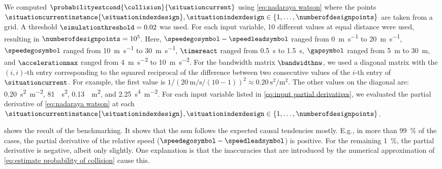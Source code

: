 We computed $\probabilityestcond{\collision}{\situationcurrent}$ using \cref{eq:nadaraya watson} where the points $\situationcurrentinstance{\situationindexdesign}, \situationindexdesign\in\{1,\ldots,\numberofdesignpoints\}$ are taken from a grid.
A threshold $\simulationthreshold=0.02$ was used.
For each input variable, 10 different values at equal distance were used, resulting in $\numberofdesignpoints=10^5$.
Here, $\speedegosymbol-\speedleadsymbol$ ranged from \SI{0}{\meter\per\second} to \SI{20}{\meter\per\second}, $\speedegosymbol$ ranged from \SI{10}{\meter\per\second} to \SI{30}{\meter\per\second}, $\timereact$ ranged from \SI{0.5}{\second} to \SI{1.5}{\second}, $\gapsymbol$ ranged from \SI{5}{\meter} to \SI{30}{\meter}, and $\accelerationmax$ ranged from \SI{4}{\meter\per\second\squared} to \SI{10}{\meter\per\second\squared}.
For the bandwidth matrix $\bandwidthnw$, we used a diagonal matrix with the $(i,i)$-th entry corresponding to the squared reciprocal of the difference between two consecutive values of the $i$-th entry of $\situationcurrent$.
For example, the first value is $1/(\SI{20}{\meter\per\second}/(10-1))^2 \approx \SI{0.20}{\second\squared\per\meter\squared}$. 
The other values on the diagonal are: \SI{0.20}{\second\squared\per\meter\squared}, \SI{81}{\per\second\squared}, \SI{0.13}{\per\meter\squared}, and \SI{2.25}{\second\tothe{4}\per\meter\squared}.
For each input variable listed in \cref{eq:input partial derivatives}, we evaluated the partial derivative of \cref{eq:nadaraya watson} at each $\situationcurrentinstance{\situationindexdesign}, \situationindexdesign\in\{1,\ldots,\numberofdesignpoints\}$.

 shows the result of the benchmarking. 
It shows that the \ac{ssm} follows the expected causal tendencies mostly. 
E.g., in more than \SI{99}{\%} of the cases, the partial derivative of the relative speed ($\speedegosymbol-\speedleadsymbol$) is positive.
For the remaining \SI{1}{\%}, the partial derivative is negative, albeit only slightly. 
One explanation is that the inaccuracies that are introduced by the numerical approximation of \cref{eq:estimate probability of collision} cause this.

